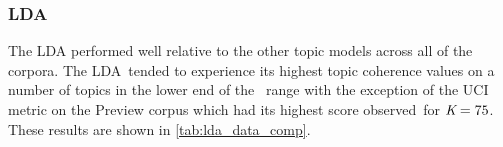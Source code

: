\documentclass[letterpaper,12pt]{article}
\begin{document}

\newpage

\subsubsection{LDA}
The LDA performed well relative to the other topic models across all of the corpora. The LDA\
tended to experience its highest topic coherence values on a number of topics in the lower end of the \
range with the exception of the UCI metric on the Preview corpus which had its highest score observed\
for $\emph{K} = 75$. These results are shown in \ref{tab:lda_data_comp}.
\end{document}
